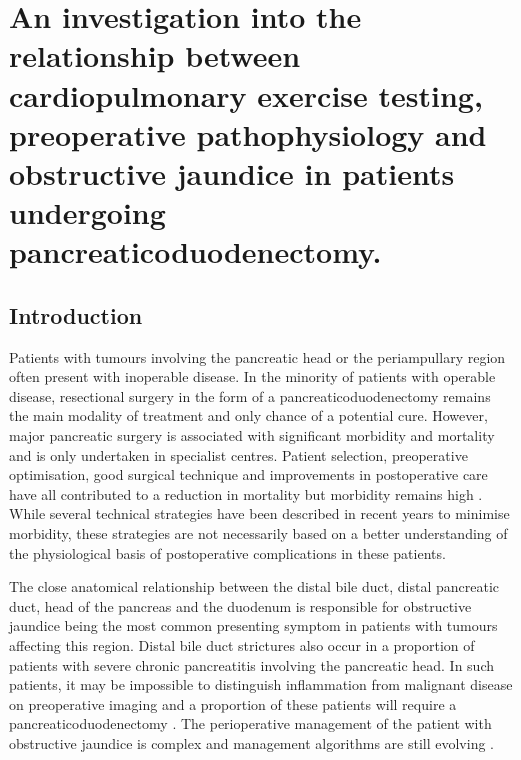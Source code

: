 
\chapter{An investigation into the relationship between cardiopulmonary exercise testing, preoperative pathophysiology and obstructive jaundice in patients undergoing pancreaticoduodenectomy.}

\label{ch_cpet_jaundice}
\clearpage


\section{Introduction}
Patients with tumours involving the pancreatic head or the periampullary region often present with inoperable disease. 
In the minority of patients with operable disease, resectional surgery in the form of a pancreaticoduodenectomy remains the main modality of treatment and only chance of a potential cure. 
However, major pancreatic surgery is associated with significant morbidity and mortality and is only undertaken in specialist centres. 
Patient selection, preoperative optimisation, good surgical technique and improvements in postoperative care have all contributed to a reduction in mortality \parencite{winter_1423_2006} but morbidity remains high \parencite{mann_review_2010}.
While several technical strategies have been described in recent years to minimise morbidity, these strategies are not necessarily based on a better understanding of the physiological basis of postoperative complications in these patients.

The close anatomical relationship between the distal bile duct, distal pancreatic duct, head of the pancreas and the duodenum is responsible for obstructive jaundice being the most common presenting symptom in patients with tumours affecting this region. 
Distal bile duct strictures also occur in a proportion of patients with severe chronic pancreatitis involving the pancreatic head.
In such patients, it may be impossible to distinguish inflammation from malignant disease on preoperative imaging and a proportion of these patients will require a pancreaticoduodenectomy \parencite{abraham_pancreaticoduodenectomy_2003}.
The perioperative management of the patient with obstructive jaundice is complex and management algorithms are still evolving \parencite{wang_preoperative_2008}. 

